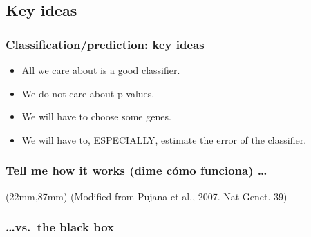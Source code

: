 \subsection{Key ideas}
\begin{frame}
\frametitle{Classification/prediction: key ideas}
\begin{itemize}
\item All we care about is a good classifier.
\item We do not care about p-values.
\item We will have to choose some genes.
\item We will have to, ESPECIALLY, estimate the error of the classifier.
\end{itemize}
\end{frame} 


\begin{frame}
\frametitle{Tell me how it works (dime c\'omo funciona) \ldots}
  \begin{textblock*}{53mm}(22mm,87mm)
    {\tiny(Modified from Pujana et al., 2007. Nat Genet. 39)}
  \end{textblock*}
\end{frame}



\begin{frame}
\frametitle{\ldots vs.\ the black box}
\end{frame}




